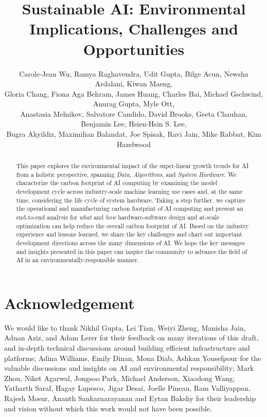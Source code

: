 \documentclass{IEEEtran}
\title{Sustainable AI: Environmental Implications, Challenges and Opportunities
}
\author{\normalsize{Carole-Jean Wu, Ramya Raghavendra, Udit Gupta, Bilge Acun, Newsha Ardalani, Kiwan Maeng,\\ Gloria Chang, Fiona Aga Behram, James Huang, Charles Bai, Michael Gschwind, Anurag Gupta, Myle Ott,\\ Anastasia Melnikov, Salvatore Candido, David Brooks, Geeta Chauhan, Benjamin Lee, Hsien-Hsin S. Lee,\\ Bugra Akyildiz, Maximilian Balandat, Joe Spisak, Ravi Jain, Mike Rabbat, Kim Hazelwood}}
\affil{Facebook AI}
\begin{document}
\maketitle
\pagestyle{plain}




\begin{abstract}
This paper explores the environmental impact of the super-linear growth trends for AI from a holistic perspective, spanning \textit{Data}, \textit{Algorithms}, and \textit{System Hardware}. 
We characterize the carbon footprint of AI computing by examining the model development cycle across industry-scale machine learning use cases and, at the same time, considering the life cycle of system hardware.
Taking a step further, we capture the operational and manufacturing carbon footprint of AI computing and present an end-to-end analysis for \textit{what} and \textit{how} hardware-software design and at-scale optimization can help reduce the overall carbon footprint of AI.
Based on the industry experience and lessons learned, we share the key challenges and chart out important development directions across the many dimensions of AI. 
We hope the key messages and insights presented in this paper can inspire the community to advance the field of AI in an environmentally-responsible manner.
\end{abstract}









\section*{Acknowledgement}

We would like to thank 
Nikhil Gupta,
Lei Tian, 
Weiyi Zheng, 
Manisha Jain,
Adnan Aziz,
and Adam Lerer for their feedback on many iterations of this draft, and in-depth technical discussions around building efficient infrastructure and platforms;  
Adina Williams,
Emily Dinan,
Mona Diab,
Ashkan Yousefpour for the valuable discussions and insights on AI and environmental responsibility; 
Mark Zhou,
Niket Agarwal,
Jongsoo Park,
Michael Anderson,
Xiaodong Wang; 
Yatharth Saraf,
Hagay Lupesco, Jigar Desai, Joelle Pineau, 
Ram Valliyappan, Rajesh Mosur,
Ananth Sankarnarayanan and
Eytan Bakshy for their leadership and vision without which this work would not have been possible. 
\end{document}
